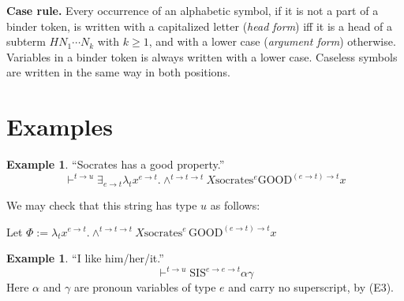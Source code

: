 \documentclass[11pt,a4paper]{article}
\theoremstyle{definition}
\newtheorem{example}[definition]{Example}
\theoremstyle{plain}
\begin{document}
\noindent\textbf{Case rule.} Every occurrence of an alphabetic symbol, if it is not a part of a binder token, is written with a capitalized letter (\emph{head form}) iff it is a head of a subterm $HN_1\cdots N_k$ with $k\ge1$, and with a lower case (\emph{argument form}) otherwise. Variables in a binder token is always written with a lower case. Caseless symbols are written in the same way in both positions.

\section{Examples}

\begin{example}
``Socrates has a good property.''
\[
\vdash^{t\to u} \exists_{e\to t} \lambda_t x^{e\to t}. \land^{t\to t\to t} X \text{socrates}^{e} \text{GOOD}^{(e\to t)\to t} x 
\]

We may check that this string has type $u$ as follows:

\begin{center}
\small
\begin{prooftree}
\end{prooftree}

\medskip
\noindent Let $\Phi := \lambda_t x^{e\to t}.\land^{t\to t\to t}X\text{socrates}^e\,\text{GOOD}^{(e\to t) \to t}x$

\medskip
\begin{prooftree}
\end{prooftree}
\end{center}
\end{example}

\begin{example}
``I like him/her/it.''
\[
\vdash^{t\to u} \text{SIS}^{e\to e\to t} \alpha \gamma
\]
Here $\alpha$ and $\gamma$ are pronoun variables of type $e$ and carry no superscript, by (E3).
\end{example}
\end{document}
